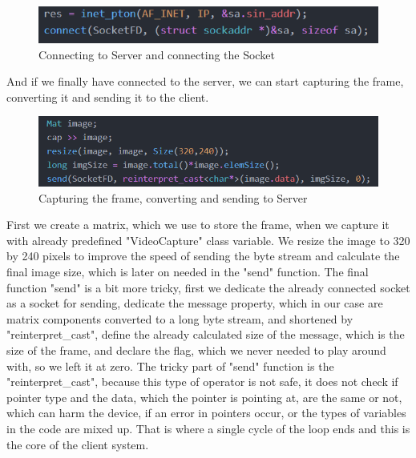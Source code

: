 \documentclass[conference]{IEEEtran}
\begin{document}
\begin{figure}[h!]
	\includegraphics[width=\linewidth]{ClientCodeExample3.png}
	\caption{Connecting to Server and connecting the Socket}
	\label{fig:CCE3}
\end{figure}
\newline
And if we finally have connected to the server, we can start capturing the frame, converting it and sending it to the client.
\begin{figure}[h!]
	\includegraphics[width=\linewidth]{ClientCodeExample4.png}
	\caption{Capturing the frame, converting and sending to Server}
	\label{fig:CCE4}
\end{figure}
First we create a matrix, which we use to store the frame, when we capture it with already predefined "VideoCapture" class variable. We resize the image to 320 by 240 pixels to improve the speed of sending the byte stream and calculate the final image size, which is later on needed in the "send" function. The final function "send" is a bit more tricky, first we dedicate the already connected socket as a socket for sending, dedicate the message property, which in our case are matrix components converted to a long byte stream, and shortened by "reinterpret\_cast", define the already calculated size of the message, which is the size of the frame, and declare the flag, which we never needed to play around with, so we left it at zero. The tricky part of "send" function is the "reinterpret\_cast", because this type of operator is not safe, it does not check if pointer type and the data, which the pointer is pointing at, are the same or not, which can harm the device, if an error in pointers occur, or the types of variables in the code are mixed up.
\newline
That is where a single cycle of the loop ends and this is the core of the client system.
\end{document}
